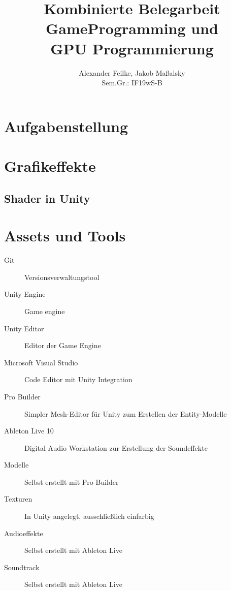 \documentclass[a4paper,ngerman,12pt]{report}
\title{Kombinierte Belegarbeit \\ GameProgramming und \\ GPU Programmierung}
\author{Alexander Feilke, Jakob Ma{\ss}alsky \\ Sem.Gr.: IF19wS-B}
\begin{document}
\normalfont

\maketitle
\newpage %

\renewcommand{\contentsname}{Inhaltsverzeichnis}
\tableofcontents
\newpage


\sloppy
\flushbottom



\chapter{Aufgabenstellung}

\lipsum[3]








\chapter{Grafikeffekte}




\section{Shader in Unity}

\lipsum[3]










\chapter{Assets und Tools}

\begin{description}
\item[Git] Versionsverwaltungstool
\item[Unity Engine] Game engine
\item[Unity Editor] Editor der Game Engine
\item[Microsoft Visual Studio] Code Editor mit Unity Integration
\item[Pro Builder] Simpler Mesh-Editor für Unity zum Erstellen der Entity-Modelle
\item[Ableton Live 10] Digital Audio Workstation zur Erstellung der Soundeffekte
\vspace{5mm}
\item[Modelle] Selbst erstellt mit Pro Builder
\item[Texturen] In Unity angelegt, ausschlie{\ss}lich einfarbig
\item[Audioeffekte] Selbst erstellt mit Ableton Live
\item[Soundtrack] Selbst erstellt mit Ableton Live

\end{description}
\end{document}

